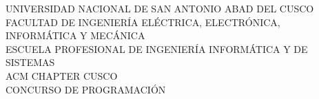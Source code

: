 \begin{center}
    \large
    UNIVERSIDAD NACIONAL DE SAN ANTONIO ABAD DEL CUSCO\\
    \vspace{0.3cm}
    FACULTAD DE INGENIERÍA ELÉCTRICA, ELECTRÓNICA, INFORMÁTICA Y MECÁNICA\\
    \vspace{0.3cm}
    ESCUELA PROFESIONAL DE INGENIERÍA INFORMÁTICA Y DE SISTEMAS\\
    \vspace{2cm}
    ACM CHAPTER CUSCO\\
    \vspace{2cm}
    \Large
    CONCURSO DE PROGRAMACIÓN\\
    \vspace{0.5cm}
    \Huge{\textbf{\cuscontestName}}\\
    \Large
    \vspace{0.5cm}
    \iftoggle{solution}{\textit{PROBLEMSET CON SOLUCIONES}}{\textit{PROBLEMSET}}
    \\
    \vspace{3cm}
    \large
    \cuscontestDate\\
\end{center}
